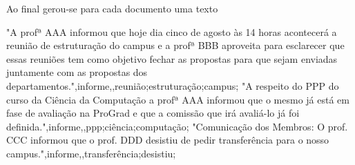 



















































Ao final gerou-se para cada documento uma texto 



"A profª AAA informou que hoje dia cinco de agosto às 14 horas acontecerá a reunião de estruturação do campus e a profª BBB aproveita para esclarecer que essas reuniões tem como objetivo fechar as propostas para que sejam enviadas juntamente com as propostas dos departamentos.",informe,,reunião;estruturação;campus;
"A respeito do PPP do curso da Ciência da Computação a profª AAA informou que o mesmo já está em fase de avaliação na ProGrad e que a comissão que irá avaliá-lo já foi definida.",informe,,ppp;ciência;computação;
"Comunicação dos Membros: O prof. CCC informou que o prof. DDD desistiu de pedir transferência para o nosso campus.",informe,,transferência;desistiu;



